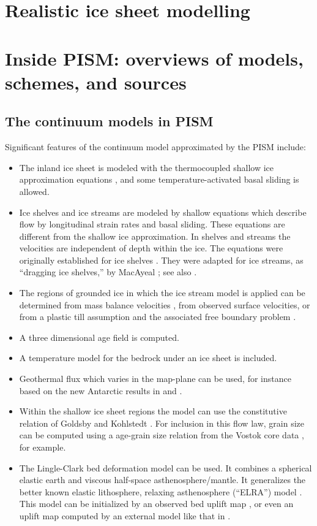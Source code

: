 \documentclass[12pt,final]{amsart}
\begin{document}
\section{Realistic ice sheet modelling}\label{sect:real}


\clearpage\newpage
\section{Inside PISM: overviews of models, schemes, and sources}\label{sect:over}

\subsection{The continuum models in PISM}  Significant features of the continuum model approximated by the PISM include:\begin{itemize}
\item The inland ice sheet is modeled with the thermocoupled shallow ice approximation equations \cite{Fowler}, and some temperature-activated basal sliding is allowed.
\item Ice shelves and ice streams are modeled by shallow equations which describe flow by longitudinal strain rates and basal sliding.  These equations are different from the shallow ice approximation.  In shelves and streams the velocities are independent of depth within the ice.  The equations were originally established for ice shelves \cite{Morland,MorlandZainuddin,MacAyealetal}.  They were adapted for ice streams, as ``dragging ice shelves,'' by MacAyeal \cite{MacAyeal}; see also \cite{HulbeMacAyeal}.
\item The regions of grounded ice in which the ice stream model is applied can be determined from mass balance velocities \cite{BamberVaughanJoughin}, from observed surface velocities, or from a plastic till assumption and the associated free boundary problem \cite{SchoofStream}.
\item A three dimensional age field is computed.
\item A temperature model for the bedrock under an ice sheet is included.
\item Geothermal flux which varies in the map-plane can be used, for instance based on the new Antarctic results in \cite{ShapiroRitzwoller} and \cite{FoxMaule}.
\item Within the shallow ice sheet regions the model can use the constitutive relation of Goldsby and Kohlstedt \cite{GoldsbyKohlstedt,Peltieretal}.  For inclusion in this flow law, grain size can be computed using a age-grain size relation from the Vostok core data \cite{VostokCore}, for example.
\item The Lingle-Clark \cite{BLKfastearth,LingleClark} bed deformation model can be used.  It combines a spherical elastic earth and viscous half-space asthenosphere/mantle.  It generalizes the better known elastic lithosphere, relaxing asthenosphere (``ELRA'') model \cite{Greve2001}.  This model can be initialized by an observed bed uplift map \cite{BLKfastearth}, or even an uplift map computed by an external model like that in \cite{IvinsJames2005}.\end{itemize}
\end{document}
